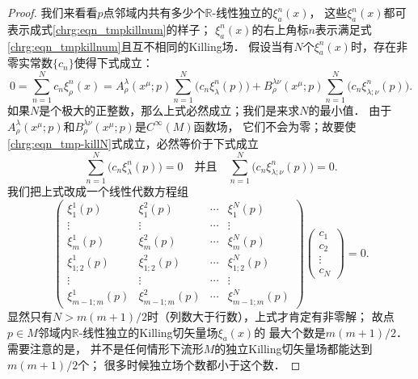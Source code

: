 \begin{proof}
    我们来看看$p$点邻域内共有多少个$\mathbb{R}$-线性独立的$\xi_a^n(x)$，
    这些$\xi_a^n(x)$都可表示成式\eqref{chrg:eqn_tmpkillnum}的样子；
    $\xi_a^n(x)$的右上角标$n$表示满足式\eqref{chrg:eqn_tmpkillnum}且互不相同的Killing场．
    假设当有$N$个$\xi_a^n(x)$时，存在非零实常数$\{c_n\}$使得下式成立：
    \begin{equation}\label{chrg:eqn_tmp-killN}
        0=\sum_{n=1}^{N} c_n \xi_\rho^n(x) =  %
        A_\rho^\lambda(x^\mu;p) \sum_{n=1}^{N} \bigl(c_n\xi_\lambda^n(p)\bigr)+
        B_\rho^{\lambda\nu}(x^\mu;p) \sum_{n=1}^{N}
         \bigl(c_n\xi_{\lambda;\nu}^n(p)\bigr)  .
    \end{equation}
    如果$N$是个极大的正整数，那么上式必然成立；我们是来求$N$的最小值．
    由于$A_\rho^\lambda(x^\mu;p)$和$B_\rho^{\lambda\nu}(x^\mu;p)$是$C^\infty(M)$函数场，
    它们不会为零；故要使\eqref{chrg:eqn_tmp-killN}式成立，必然等价于下式成立
    \begin{equation}\label{chrg:eqn_tmp-killN2}
        \sum_{n=1}^{N} \bigl(c_n\xi_\lambda^n(p)\bigr) =0
        \quad \text{并且}\quad
        \sum_{n=1}^{N} \bigl(c_n\xi_{\lambda;\nu}^n(p)\bigr) =0 .
    \end{equation}
    我们把上式改成一个线性代数方程组
    \begin{equation}\label{chrg:eqn_kvm}
        \begin{pmatrix}
            \xi_1^1(p)& \xi_1^2(p)& \cdots & \xi_1^N(p) \\
            \vdots & \vdots & \cdots & \vdots \\
            \xi_m^1(p)& \xi_m^2(p)& \cdots & \xi_m^N(p) \\
            \xi_{1;2}^1(p)& \xi_{1;2}^2(p)& \cdots & \xi_{1;2}^N(p) \\
            \vdots & \vdots & \cdots & \vdots \\
            \xi_{m-1;m}^1(p)& \xi_{m-1;m}^2(p)& \cdots & \xi_{m-1;m}^N(p)
        \end{pmatrix}
        \begin{pmatrix}
            c_1 \\ c_2 \\ \vdots \\ c_N
        \end{pmatrix} =0 .
    \end{equation}
    显然只有$N>m(m+1)/2$时（列数大于行数），上式才肯定有非零解；
    故点$p\in M$邻域内$\mathbb{R}$-线性独立的Killing切矢量场$\xi_a(x)$的
    最大个数是$m(m+1)/2$．需要注意的是，
    并不是任何情形下流形$M$的独立Killing切矢量场都能达到$m(m+1)/2$个；
    很多时候独立场个数都小于这个数．   
\end{proof}

